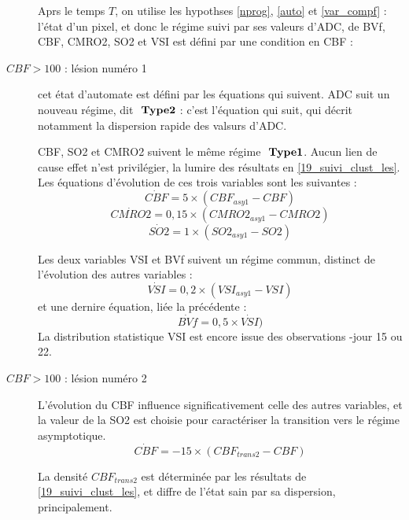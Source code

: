 \begin{description}
Aprs le temps $T$, on utilise les hypothses \ref{nprog}, \ref{auto} et \ref{var_compf} : %
l'\'etat d'un pixel, et donc le r\'egime suivi par ses valeurs d'ADC, de BVf, CBF, CMRO2, SO2 et VSI est d\'efini par une condition en CBF :
%
\item[$CBF > 100$ : l\'esion num\'ero 1 ] cet \'etat d'automate est d\'efini par les \'equations qui suivent.
ADC suit un nouveau r\'egime, dit $\ \mathbf{Type 2}$ : c'est l'\'equation qui suit, qui d\'ecrit notamment la dispersion rapide des valsurs d'ADC.

CBF, SO2 et CMRO2 suivent le m\^eme r\'egime $\ \mathbf{Type 1}$. Aucun lien de cause  effet n'est  privil\'egier,  la lumire des r\'esultats en \ref{19_suivi_clust_les}. %
Les \'equations d'\'evolution de ces trois variables sont les suivantes :
\begin{equation}
\dot{CBF}=5\times\left(CBF_{asy1}-CBF\right)
\end{equation}
\begin{equation}
\dot{CMRO2}=0,15\times\left(CMRO2_{asy1}-CMRO2\right)
\end{equation}
\begin{equation}
\dot{SO2}=1\times\left(SO2_{asy1}-SO2\right)
\end{equation}

Les deux variables VSI et BVf suivent un r\'egime commun, distinct de l'\'evolution des autres variables :
\begin{equation}
\dot{VSI}=0,2\times (VSI_{asy1}-VSI)
\end{equation}
et une dernire \'equation, li\'ee  la pr\'ec\'edente :
\begin{equation}
\dot{BVf}=0,5\times\dot{VSI})
\end{equation}
La distribution statistique VSI est encore issue des observations -jour 15 ou 22.
%
\item[$CBF > 100$ : l\'esion num\'ero 2 ] L'\'evolution du CBF influence significativement celle des autres variables, %
et la valeur de la SO2 est choisie pour caract\'eriser la transition vers le r\'egime asymptotique.
\begin{equation}
\dot{CBF}=-15\times\left(CBF_{trans2}-CBF\right)
\end{equation}

La densit\'e $CBF_{trans2}$ est d\'etermin\'ee par les r\'esultats de \ref{19_suivi_clust_les}, %
et diffre de l'\'etat sain par sa dispersion, principalement.


\end{description}
